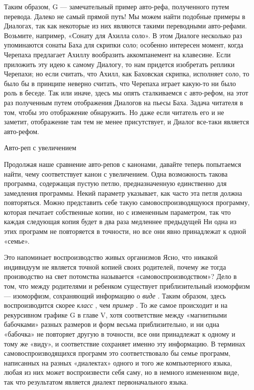Таким образом, G --- замечательный пример авто-рефа, полученного путем перевода. Далеко не самый прямой путь! Мы можем найти подобные примеры в Диалогах, так как некоторые из них являются такими переводными авто-рефами. Возьмите, например, «Сонату для Ахилла соло». В этом Диалоге несколько раз упоминаются сонаты Баха для скрипки соло; особенно интересен момент, когда Черепаха предлагает Ахиллу вообразить аккомпанемент на клавесине. Если приложить эту идею к самому Диалогу, то нам придется изобретать реплики Черепахи; но если считать, что Ахилл, как Баховская скрипка, исполняет соло, то было бы в принципе неверно считать, что Черепаха играет какую-то ни было роль в беседе. Так или иначе, здесь мы опять сталкиваемся с авто-рефом, на этот раз полученным путем отображения Диалогов на пьесы Баха. Задача читателя в том, чтобы это отображение обнаружить. Но даже если читатель его и не заметит, отображение там тем не менее присутствует, и Диалог все-таки является авто-рефом.

Авто-реп с увеличением

Продолжая наше сравнение авто-репов с канонами, давайте теперь попытаемся найти, чему соответствует канон с увеличением. Одна возможность такова программа, содержащая пустую петлю, предназначенную единственно для замедления программы. Некий параметр указывает, как часто эта петля должна повторяться. Можно представить себе такую самовоспроизводящуюся программу, которая печатает собственные копии, но с измененным параметром, так что каждая следующая копия будет в два раза медленнее предыдущей Ни одна из этих программ не повторяется в точности, но все они явно принадлежат к одной «семье».

Это напоминает воспроизводство живых организмов Ясно, что никакой индивидуум не является точной копией своих родителей, почему же тогда производство на свет потомства называется «самовоспроизводством»? Дело в том, что между родителями и ребенком существует приблизительный изоморфизм --- изоморфизм, сохраняющий информацию о \emph{виде} . Таким образом, здесь воспроизводится скорее \emph{класс} , чем \emph{пример} . То же самое происходит и на рекурсивном графике G в главе V, хотя соответствие между «магнитными бабочками» разных размеров и форм весьма приблизительно, и ни одна «бабочка» не повторяет другую в точности, все они принадлежат к одному и тому же «виду», и соответствие сохраняет именно эту информацию. В терминах самовоспроизводящихся программ это соответствовало бы семье программ, написанных на разных «диалектах» одного и того же компьютерного языка, любая из них может воспроизвести себя саму, но в немного измененном виде, так что результатом является диалект первоначального языка.

